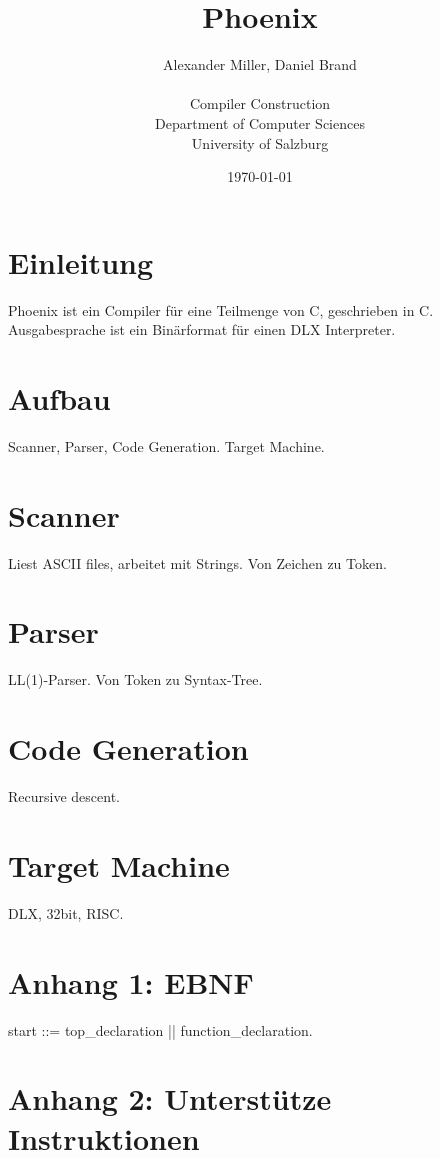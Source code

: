 \documentclass{article}
\title{Phoenix}
\author{Alexander Miller, Daniel Brand \\ \\
		Compiler Construction \\
		Department of Computer Sciences \\
		University of Salzburg}
\date{\today}
\begin{document}
	\maketitle
	\newpage
	\tableofcontents
	\newpage

	\section{Einleitung}
	Phoenix ist ein Compiler für eine Teilmenge von C, geschrieben in C. Ausgabesprache ist ein Binärformat für einen DLX Interpreter.

	\section{Aufbau}
	Scanner, Parser, Code Generation. Target Machine.

	\section{Scanner}
	Liest ASCII files, arbeitet mit Strings. Von Zeichen zu Token.

	\section{Parser}
	LL(1)-Parser. Von Token zu Syntax-Tree.

	\section{Code Generation}
	Recursive descent.

	\section{Target Machine}
	DLX, 32bit, RISC.

	\section{Anhang 1: EBNF}
	start ::= top\_declaration || function\_declaration.

	\section{Anhang 2: Unterstütze Instruktionen}
\end{document}
